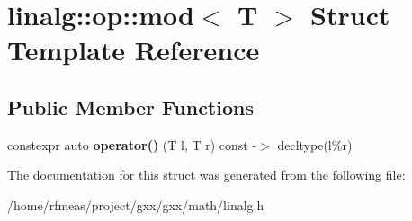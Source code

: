 \hypertarget{structlinalg_1_1op_1_1mod}{}\section{linalg\+:\+:op\+:\+:mod$<$ T $>$ Struct Template Reference}
\label{structlinalg_1_1op_1_1mod}
\subsection*{Public Member Functions}
\begin{DoxyCompactItemize}
\item 
constexpr auto {\bfseries operator()} (T l, T r) const -\/$>$ decltype(l\%r)\hypertarget{structlinalg_1_1op_1_1mod_a8a73845b6b0b67812ca3c1157bdbc07e}{}\label{structlinalg_1_1op_1_1mod_a8a73845b6b0b67812ca3c1157bdbc07e}

\end{DoxyCompactItemize}


The documentation for this struct was generated from the following file\+:\begin{DoxyCompactItemize}
\item 
/home/rfmeas/project/gxx/gxx/math/linalg.\+h\end{DoxyCompactItemize}
